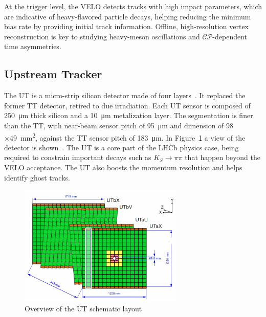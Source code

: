 At the trigger level, the VELO detects tracks with high impact parameters, which are indicative of heavy-flavored particle decays, helping reducing the minimum bias rate by providing initial track information. Offline, high-resolution vertex reconstruction is key to studying heavy-meson oscillations and $\mathcal{CP}$-dependent time asymmetries.
\subsection{Upstream Tracker}
The UT is a micro-strip silicon detector made of four layers~\cite{LHCb:2014uqj}. It replaced the former TT detector, retired to due irradiation. Each UT sensor is composed of \SI{250}{\micro\meter} thick silicon and a \SI{10}{\micro\meter} metalization layer. The segmentation is finer than the TT, with near-beam sensor pitch of \SI{95}{\micro\meter} and dimension of $98$×\SI{49}{\milli\meter\squared}, against the TT sensor pitch of \SI{183}{\micro\meter}. In Figure~\ref{fig:UT} a view of the detector is shown~\cite{ut}. 
The UT is a core part of the LHCb physics case, being required to constrain important decays such as $K_S \rightarrow\pi\pi$ that happen beyond the VELO acceptance. The UT also boosts the momentum resolution and helps identify ghost tracks.

\begin{figure}
    \centering
    \includegraphics[width=0.7\textwidth]{figures/UT.png}
    \caption{Overview of the UT schematic layout}
    \label{fig:UT}
\end{figure}


